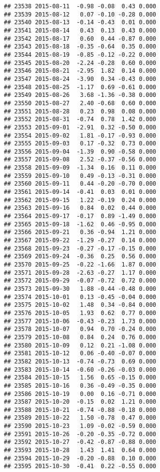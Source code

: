 \documentclass[
]{article}
\begin{document}
\begin{verbatim}
## 23538 2015-08-11  -0.98 -0.08  0.43 0.000
## 23539 2015-08-12   0.07 -0.10 -0.28 0.000
## 23540 2015-08-13  -0.14 -0.43  0.01 0.000
## 23541 2015-08-14   0.43  0.13  0.43 0.000
## 23542 2015-08-17   0.60  0.44 -0.87 0.000
## 23543 2015-08-18  -0.35 -0.64  0.35 0.000
## 23544 2015-08-19  -0.85 -0.12 -0.22 0.000
## 23545 2015-08-20  -2.24 -0.28  0.60 0.000
## 23546 2015-08-21  -2.95  1.82  0.14 0.000
## 23547 2015-08-24  -3.90  0.34 -0.43 0.000
## 23548 2015-08-25  -1.17  0.69 -0.61 0.000
## 23549 2015-08-26   3.68 -1.36 -0.38 0.000
## 23550 2015-08-27   2.40 -0.68  0.60 0.000
## 23551 2015-08-28   0.23  0.98  0.08 0.000
## 23552 2015-08-31  -0.74  0.78  1.42 0.000
## 23553 2015-09-01  -2.91  0.32 -0.50 0.000
## 23554 2015-09-02   1.81 -0.17 -0.93 0.000
## 23555 2015-09-03   0.17 -0.32  0.73 0.000
## 23556 2015-09-04  -1.39  0.90 -0.58 0.000
## 23557 2015-09-08   2.52 -0.37 -0.56 0.000
## 23558 2015-09-09  -1.34  0.16  0.11 0.000
## 23559 2015-09-10   0.49 -0.13 -0.31 0.000
## 23560 2015-09-11   0.44 -0.20 -0.70 0.000
## 23561 2015-09-14  -0.41  0.03  0.01 0.000
## 23562 2015-09-15   1.22 -0.19  0.24 0.000
## 23563 2015-09-16   0.84  0.02  0.44 0.000
## 23564 2015-09-17  -0.17  0.89 -1.49 0.000
## 23565 2015-09-18  -1.62  0.46 -0.95 0.000
## 23566 2015-09-21   0.36 -0.94  1.21 0.000
## 23567 2015-09-22  -1.29 -0.27  0.14 0.000
## 23568 2015-09-23  -0.27 -0.17 -0.15 0.000
## 23569 2015-09-24  -0.36  0.25  0.56 0.000
## 23570 2015-09-25  -0.22 -1.66  1.87 0.000
## 23571 2015-09-28  -2.63 -0.27  1.17 0.000
## 23572 2015-09-29  -0.07 -0.72  0.72 0.000
## 23573 2015-09-30   1.88 -0.44 -0.48 0.000
## 23574 2015-10-01   0.13 -0.45 -0.04 0.000
## 23575 2015-10-02   1.48  0.34 -0.84 0.000
## 23576 2015-10-05   1.93  0.62  0.77 0.000
## 23577 2015-10-06  -0.43 -0.23  1.73 0.000
## 23578 2015-10-07   0.94  0.70 -0.24 0.000
## 23579 2015-10-08   0.84  0.24  0.76 0.000
## 23580 2015-10-09   0.12  0.21 -1.08 0.000
## 23581 2015-10-12   0.06 -0.40 -0.07 0.000
## 23582 2015-10-13  -0.74 -0.73  0.69 0.000
## 23583 2015-10-14  -0.60 -0.26 -0.03 0.000
## 23584 2015-10-15   1.56  0.65 -0.15 0.000
## 23585 2015-10-16   0.36 -0.49 -0.35 0.000
## 23586 2015-10-19   0.00  0.16 -0.71 0.000
## 23587 2015-10-20  -0.15  0.02  1.21 0.000
## 23588 2015-10-21  -0.74 -0.88 -0.18 0.000
## 23589 2015-10-22   1.50 -0.78  0.47 0.000
## 23590 2015-10-23   1.09 -0.02 -0.59 0.000
## 23591 2015-10-26  -0.20 -0.35 -0.72 0.000
## 23592 2015-10-27  -0.42 -0.87 -0.88 0.000
## 23593 2015-10-28   1.43  1.41  0.64 0.000
## 23594 2015-10-29  -0.20 -0.88  0.10 0.000
## 23595 2015-10-30  -0.41  0.22 -0.55 0.000

\end{verbatim}
\end{document}
